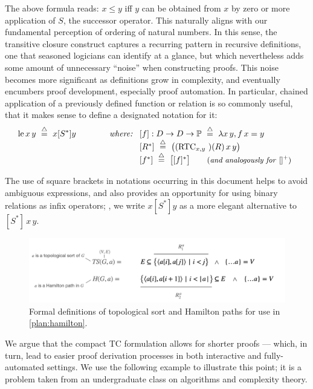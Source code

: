 The above formula reads: $x\leq y$ iff $y$ can be obtained from $x$ by zero or more application of $S$, the successor operator.
This naturally aligns with our fundamental perception of ordering of natural numbers.
In this sense, the transitive closure construct captures a recurring pattern in recursive definitions, one that seasoned logicians can identify at a glance, but which nevertheless adds some amount of unnecessary ``noise'' when constructing proofs.
This noise becomes more significant as definitions grow in complexity, and eventually encumbers proof development, especially proof automation.
In particular, chained application of a previously defined function or relation is so commonly useful, that it makes sense to define a designated notation for it:
\[
\mathrm{le}\,x\,y ~\overset{\triangle}{=}~ x[S^*]y \hspace{4em}
\textit{where:}~
\begin{array}[t]{l}
  {} [f] : D\to D\to\mathbb{P} ~\overset{\triangle}{=}~ \lambda x\,y, f\,x=y \\
  {} [R^*] ~\overset{\triangle}{=}~ \big((\mathrm{RTC}_{x,y}\,\,)(R)\,x\,y\big) \\
  {} [f^*] ~\overset{\triangle}{=}~ \big[[f]^*\big]  \qquad\textrm{\small(\textit{and analogously for} ${[]}^+$)}
\end{array}
\]

The use of square brackets in notations occurring in this document helps to avoid ambiguous expressions, and also provides an opportunity for using binary relations as infix operators;
\eg, we write $x[S^*]y$ as a more elegant alternative to $[S^*]\,x\,y$.

\begin{figure}
\begin{center}
\includegraphics[width=.8\textwidth]{img/topological-and-hamilton.png}
\end{center}
\caption{Formal definitions of topological sort and Hamilton paths
  for use in \autoref{plan:hamilton}.}
\label{plan:hamilton-defs}
\end{figure}

We argue that the compact TC formulation allows for shorter proofs --- which, in turn, lead to easier proof derivation processes in both interactive and fully-automated settings.
We use the following example to illustrate this point; it is a problem taken from an undergraduate class on algorithms and complexity theory.

